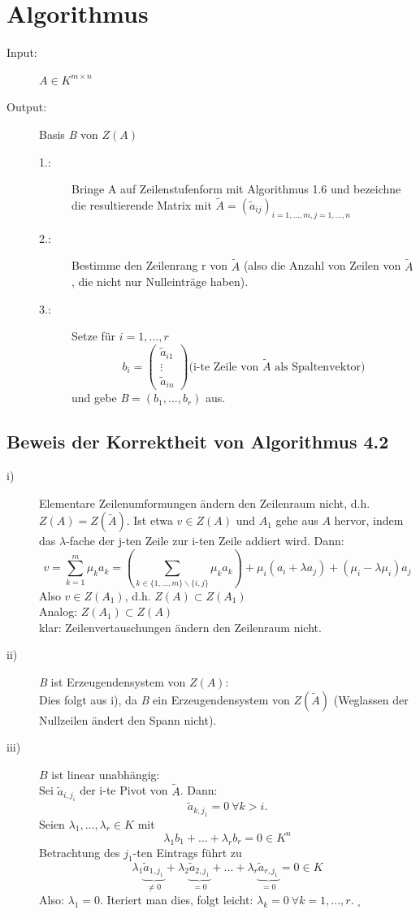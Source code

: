 \documentclass{scrbook}
\begin{document}
\section{Algorithmus}
\begin{description}
\item[Input:] $A \in K^{m \times n}$
\item[Output:] Basis \textit{B} von $Z(A)$
\begin{description}
\item[1.:] Bringe A auf Zeilenstufenform mit Algorithmus 1.6 und bezeichne die resultierende Matrix mit $\tilde{A}=(\tilde{a}_{ij})_{i=1,...,m,j=1,...,n}$ 
\item[2.:] Bestimme den Zeilenrang r von $\tilde{A}$ (also die Anzahl von Zeilen von $\tilde{A}$, die nicht nur Nulleinträge haben).
\item[3.:] Setze für $i = 1,...,r$
\[
b_i=\left(
\begin{array}{c}
\tilde{a}_{i1}\\\vdots\\\tilde{a}_{in}
\end{array}
\right)\text{(i-te Zeile von }\tilde{A}\text{ als Spaltenvektor)}
\]
und gebe \textit{B}$=(b_1,...,b_r)$ aus.
\end{description}
\end{description}
\subsection*{Beweis der Korrektheit von Algorithmus 4.2}
\begin{description}
\item[i)] Elementare Zeilenumformungen ändern den Zeilenraum nicht, d.h. $Z(A)=Z(\tilde{A})$. Ist etwa $v\in Z(A)$ und $A_1$ gehe aus $A$ hervor, indem das $\lambda$-fache der j-ten Zeile zur i-ten Zeile addiert wird. Dann:
\[
v=\sum^m_{k=1}\mu_ka_k=\left(\sum_{k\in \{1,...,m\}\backslash\{i,j\}} \mu_ka_k \right)+\mu_i(a_i+\lambda a_j)+(\mu_i-\lambda\mu_i)a_j
\]
Also $v\in Z(A_1)$, d.h. $Z(A)\subset Z(A_1)$\\
Analog: $Z(A_1)\subset Z(A)$\\
klar: Zeilenvertauschungen ändern den Zeilenraum nicht.
\item[ii)] \textit{B} ist Erzeugendensystem von $Z(A)$:\\
Dies folgt aus i), da \textit{B} ein Erzeugendensystem von $Z(\tilde{A})$ (Weglassen der Nullzeilen ändert den Spann nicht).
\item[iii)] $B$ ist linear unabhängig:\\
Sei $\tilde{a}_{i,j_i}$ der i-te Pivot von $\tilde{A}$. Dann:\[
\tilde{a}_{k,j_1} = 0 \ \forall k >i.
\]
Seien $\lambda_1,...,\lambda_r \in K$ mit 
\[
\lambda_1 b_1+...+\lambda_r b_r = 0 \in K^n
\]
Betrachtung des $j_1$-ten Eintrags führt zu\[
\lambda_1\underbrace{\tilde{a}_{1,j_1}}_{\neq 0}+\lambda_2\underbrace{\tilde{a}_{2,j_1}}_{=0}+...+\lambda_r\underbrace{\tilde{a}_{r,j_1}}_{=0} = 0 \in K
\]
Also: $\lambda_1=0$. Iteriert man dies, folgt leicht: $\lambda_k=0 \  \forall k=1,...,r$. $_\square$ 
\end{description}
\end{document}
